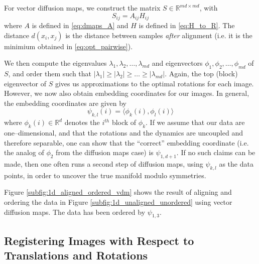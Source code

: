 \documentclass[11pt]{article}
\begin{document}
For vector diffusion maps, we construct the matrix $S \in \mathbb{R}^{md \times md}$, with
\begin{equation}
	S_{ij} = A_{ij} H_{ij}
\end{equation}
%
where $A$ is defined in \eqref{eq:dmaps_A} and $H$ is defined in \eqref{eq:H_to_R}.
%
The distance $d(x_i, x_j)$ is the distance between samples {\em after} alignment (i.e. it is the minimium obtained in \eqref{eq:opt_pairwise}). 

We then compute the eigenvalues $\lambda_1, \lambda_2, \dots, \lambda_{md}$ and eigenvectors $\phi_1, \phi_2, \dots, \phi_{md}$ of $S$, and order them such that $|\lambda_1| \ge |\lambda_2| \ge \dots \ge |\lambda_{md}|$.
%
Again, the top (block) eigenvector of $S$ gives us approximations to the optimal rotations for each image.
%
However, we now also obtain embedding coordinates for our images.
%
In general, the embedding coordinates are given by 
\begin{equation}
\psi_{k,l} (i) = \langle \phi_k(i), \phi_l(i) \rangle
\end{equation}
where $\phi_k(i) \in \mathbb{R}^d$ denotes the $i^{th}$ block of $\phi_k$.
%
If we assume that our data are one--dimensional, and that the rotations and the dynamics are uncoupled and therefore separable, one can show that the ``correct'' embedding coordinate (i.e. the analog of $\phi_2$ from the diffusion maps case) is $\psi_{1,d+1}$.
%
If no such claims can be made, then one often runs a second step of diffusion maps, using $\psi_{k,l}$ as the data points, in order to uncover the true manifold modulo symmetries. 

Figure \ref{subfig:1d_aligned_ordered_vdm} shows the result of aligning and ordering the data in Figure \ref{subfig:1d_unaligned_unordered} using vector diffusion maps. 
%
The data has been ordered by $\psi_{1, 3}$. 

\subsection{Registering Images with Respect to Translations and Rotations}
\end{document}
